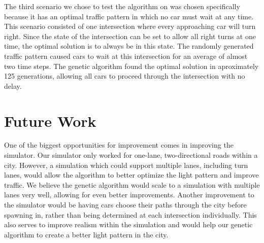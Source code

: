 \documentclass[12pt, letterpaper]{article}
\begin{document}
The third scenario we chose to test the algorithm on was chosen specifically because it has an optimal traffic pattern in which no car must wait at any time. 
This scenario consisted of one intersection where every approaching car will turn right.
Since the state of the intersection can be set to allow all right turns at one time, the optimal solution is to always be in this state.
The randomly generated traffic pattern caused cars to wait at this intersection for an average of almost two time steps. 
The genetic algorithm found the optimal solution in aproximately 125 generations, allowing all cars to proceed through the intersection with no delay.


\section*{Future Work}
One of the biggest opportunities for improvement comes in improving the simulator.
Our simulator only worked for one-lane, two-directional roads within a city.
However, a simulation which could support multiple lanes, including turn lanes, would allow the algorithm to better optimize the light pattern and improve traffic.
We believe the genetic algorithm would scale to a simulation with multiple lanes very well, allowing for even better improvements.
Another improvement to the simulator would be having cars choose their paths through the city before spawning in, rather than being determined at each intersection individually.
This also serves to improve realism within the simulation and would help our genetic algorithm to create a better light pattern in the city.
\end{document}
